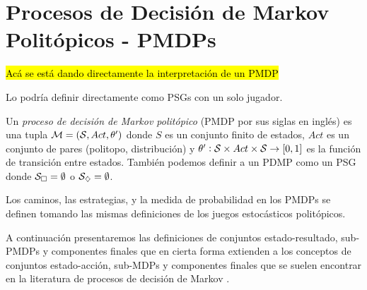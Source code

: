 \section{Procesos de Decisión de Markov Politópicos - PMDPs}
\label{sec:pmdp}

\hl{Acá se está dando directamente la interpretación de un PMDP}

Lo podría definir directamente como PSGs con un solo jugador.

\begin{definition}
	Un \textit{proceso de decisión de Markov politópico} (PMDP por sus siglas en inglés) es una tupla $\mathcal{M} = (\mathcal{S}, Act, \theta')$ donde $S$ es un conjunto finito de estados, $Act$ es un conjunto de pares (politopo, distribución) y $\theta': \mathcal{S} \times Act \times \mathcal{S} \rightarrow [0, 1]$ es la función de transición entre estados. También podemos definir a un PDMP como un PSG donde $\mathcal{S}_\square = \emptyset$ o $\mathcal{S}_\diamondsuit = \emptyset$.
\end{definition}


Los caminos, las estrategias, y la medida de probabilidad en los PMDPs se
definen tomando las mismas definiciones de los juegos estocásticos politópicos.

A continuación presentaremos las definiciones de conjuntos estado-resultado,
sub-PMDPs y componentes finales que en cierta forma extienden a los conceptos
de conjuntos estado-acción, sub-MDPs y componentes finales que se suelen
encontrar en la literatura de procesos de decisión de Markov
\cite{AlfaroThesis,BaierKatoen}.

